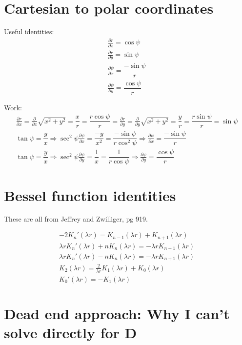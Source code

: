 \documentclass[11pt]{amsart}
\newcommand{\bD}{\mathbf{D}}
\newcommand{\pd}[2]{\ensuremath{\frac{\partial #1}{\partial #2}}}
\begin{document}
	\appendix
	\section{Cartesian to polar coordinates}

	Useful identities:
	\begin{align*}
		\pd{r}{x} = \cos\psi\\ 
		\pd{r}{y} = \sin\psi\\ 
		\pd{\psi}{x} = \dfrac{-\sin\psi}{r}\\ 
		\pd{\psi}{y} = \dfrac{\cos\psi}{r} 
	\end{align*}

	Work:
	\begin{align*}
		\pd{r}{x} = \pd{}{x}\sqrt{x^2 + y^2} = \dfrac{x}{r} = \dfrac{r\cos\psi}{r} = 
		\pd{r}{y} = \pd{}{y}\sqrt{x^2 + y^2} = \dfrac{y}{r} = \dfrac{r\sin\psi}{r} = \sin\psi \\ 
		\tan\psi = \dfrac{y}{x} \Rightarrow \sec^2\psi\pd{\psi}{x} = \dfrac{-y}{x^2} = \dfrac{-\sin\psi}{r\cos^2\psi} \Rightarrow \pd{\psi}{x} = \dfrac{-\sin\psi}{r}\\ 
		\tan\psi = \dfrac{y}{x} \Rightarrow \sec^2\psi\pd{\psi}{y} = \dfrac{1}{x} = \dfrac{1}{r\cos\psi} \Rightarrow \pd{\psi}{y} = \dfrac{\cos\psi}{r} 
	\end{align*}
	
	\section{Bessel function identities}\label{app:bessel}
	
	These are all from Jeffrey and Zwilliger, pg 919.
	
	\begin{align*}
		-2K_n'(\lambda r)  = K_{n-1}(\lambda r) + K_{n+1}(\lambda r) \\
		\lambda r K_n'(\lambda r) + nK_n(\lambda r) = -\lambda r K_{n-1}(\lambda r) \\
		\lambda r K_n'(\lambda r) - nK_n(\lambda r) = -\lambda r K_{n+1}(\lambda r) \\
		K_2(\lambda r) = \frac{2}{\lambda r}K_1(\lambda r)+ K_0(\lambda r)\\
		K_0'(\lambda r) = -K_1(\lambda r)
	\end{align*}

	\section{Dead end approach: Why I can't solve directly for $\bD$}
\end{document}

